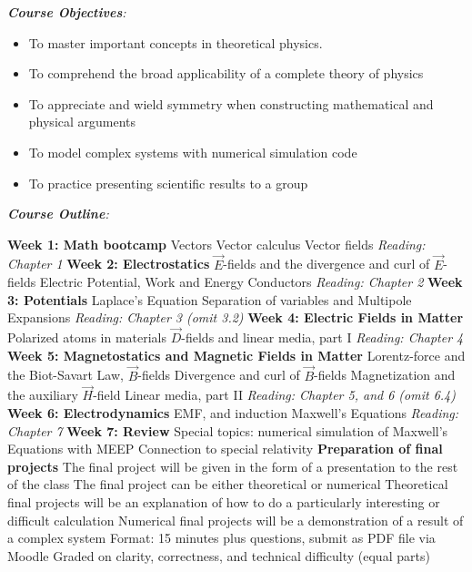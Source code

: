 \documentclass[10pt]{article}
\begin{document}
\textit{\textbf{Course Objectives}:}
\begin{itemize}
\item To master important concepts in theoretical physics.
\item To comprehend the broad applicability of a complete theory of physics
\item To appreciate and wield symmetry when constructing mathematical and physical arguments
\item To model complex systems with numerical simulation code
\item To practice presenting scientific results to a group
\end{itemize}
\textit{\textbf{Course Outline}:}
\begin{outline}[enumerate]
\1 \textbf{Week 1: Math bootcamp}
\2 Vectors
\2 Vector calculus
\2 Vector fields
\2 \textit{Reading: Chapter 1}
\1 \textbf{Week 2: Electrostatics}
\2 $\vec{E}$-fields and the divergence and curl of $\vec{E}$-fields
\2 Electric Potential, Work and Energy
\2 Conductors
\2 \textit{Reading: Chapter 2}
\1 \textbf{Week 3: Potentials}
\2 Laplace's Equation
\2 Separation of variables and Multipole Expansions
\2 \textit{Reading: Chapter 3 (omit 3.2)}
\1 \textbf{Week 4: Electric Fields in Matter}
\2 Polarized atoms in materials
\2 $\vec{D}$-fields and linear media, part I
\2 \textit{Reading: Chapter 4}
\1 \textbf{Week 5: Magnetostatics and Magnetic Fields in Matter}
\2 Lorentz-force and the Biot-Savart Law, $\vec{B}$-fields
\2 Divergence and curl of $\vec{B}$-fields
\2 Magnetization and the auxiliary $\vec{H}$-field
\2 Linear media, part II
\2 \textit{Reading: Chapter 5, and 6 (omit 6.4)}
\1 \textbf{Week 6: Electrodynamics}
\2 EMF, and induction
\2 Maxwell's Equations
\2 \textit{Reading: Chapter 7}
\1 \textbf{Week 7: Review}
\2 Special topics: numerical simulation of Maxwell's Equations with MEEP
\2 Connection to special relativity
\2 \textbf{Preparation of final projects}
\3 The final project will be given in the form of a presentation to the rest of the class
\3 The final project can be either theoretical or numerical
\3 Theoretical final projects will be an explanation of how to do a particularly interesting or difficult calculation
\3 Numerical final projects will be a demonstration of a result of a complex system
\3 Format: 15 minutes plus questions, submit as PDF file via Moodle
\3 Graded on clarity, correctness, and technical difficulty (equal parts)
\end{outline}
\end{document}
